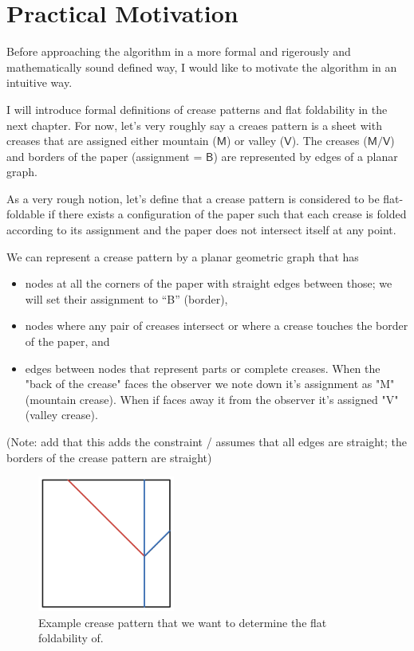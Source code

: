 \chapter{Practical Motivation}

Before approaching the algorithm in a more formal and rigerously and mathematically sound defined way, I would like to motivate the algorithm in an intuitive way.

I will introduce formal definitions of crease patterns and flat foldability in the next chapter.
For now, let's very roughly say a creaes pattern is a sheet with creases that are assigned either mountain ($\textsf{M}$) or valley ($\textsf{V}$).
The creases ($\textsf{M}/\textsf{V}$) and borders of the paper (assignment = $\textsf{B}$) are represented by edges of a planar graph.

As a very rough notion, let's define that a crease pattern is considered to be flat-foldable if there exists a configuration
of the paper such that each crease is folded according to its assignment and the paper does not intersect itself at any point.

We can represent a crease pattern by a planar geometric graph that has
\begin{itemize}
    \item nodes at all the corners of the paper with straight edges between those; we will set their assignment to ``B'' (border),
    \item nodes where any pair of creases intersect or where a crease touches the border of the paper, and
    \item edges between nodes that represent parts or complete creases. When the "back of the crease" faces the observer we note down it's assignment as "M" (mountain crease). When if faces away it from the observer it's assigned "V" (valley crease).
\end{itemize}

(Note: add that this adds the constraint / assumes that all edges are straight; the borders of the crease pattern are straight)

\begin{figure}[h]
\centering
\includegraphics[width=0.4\textwidth]{assets/demo_creasepattern.png}
\caption{Example crease pattern that we want to determine the flat foldability of.}
\label{fig:demo_creasepattern}
\end{figure}

